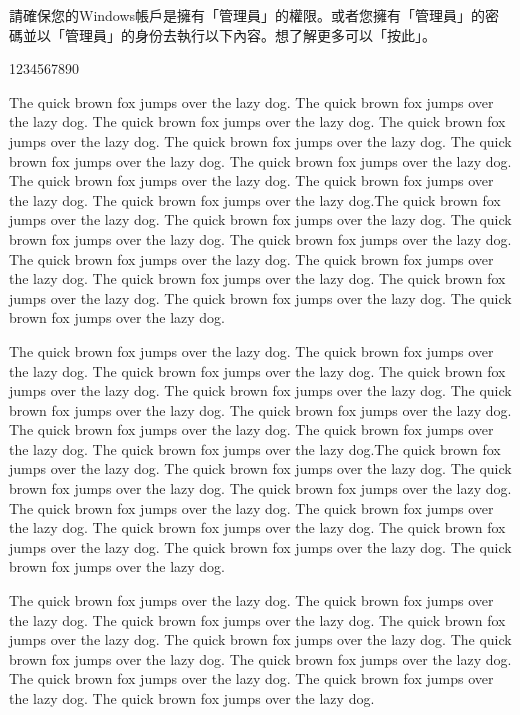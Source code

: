 \documentclass[12pt,a4paper]{article}
\begin{document}
請確保您的Windows帳戶是擁有「管理員」的權限。或者您擁有「管理員」的密碼並以「管理員」的身份去執行以下內容。想了解更多可以「按此」。

1234567890

The quick brown fox jumps over the lazy dog.  The quick brown fox jumps over the lazy dog.  The quick brown fox jumps over the lazy dog.  The quick brown fox jumps over the lazy dog.  The quick brown fox jumps over the lazy dog.  The quick brown fox jumps over the lazy dog.  The quick brown fox jumps over the lazy dog.  The quick brown fox jumps over the lazy dog.  The quick brown fox jumps over the lazy dog.  The quick brown fox jumps over the lazy dog.The quick brown fox jumps over the lazy dog.  The quick brown fox jumps over the lazy dog.  The quick brown fox jumps over the lazy dog.  The quick brown fox jumps over the lazy dog.  The quick brown fox jumps over the lazy dog.  The quick brown fox jumps over the lazy dog.  The quick brown fox jumps over the lazy dog.  The quick brown fox jumps over the lazy dog.  The quick brown fox jumps over the lazy dog.  The quick brown fox jumps over the lazy dog.

The quick brown fox jumps over the lazy dog.  The quick brown fox jumps over the lazy dog.  The quick brown fox jumps over the lazy dog.  The quick brown fox jumps over the lazy dog.  The quick brown fox jumps over the lazy dog.  The quick brown fox jumps over the lazy dog.  The quick brown fox jumps over the lazy dog.  The quick brown fox jumps over the lazy dog.  The quick brown fox jumps over the lazy dog.  The quick brown fox jumps over the lazy dog.The quick brown fox jumps over the lazy dog.  The quick brown fox jumps over the lazy dog.  The quick brown fox jumps over the lazy dog.  The quick brown fox jumps over the lazy dog.  The quick brown fox jumps over the lazy dog.  The quick brown fox jumps over the lazy dog.  The quick brown fox jumps over the lazy dog.  The quick brown fox jumps over the lazy dog.  The quick brown fox jumps over the lazy dog.  The quick brown fox jumps over the lazy dog.

The quick brown fox jumps over the lazy dog.  The quick brown fox jumps over the lazy dog.  The quick brown fox jumps over the lazy dog.  The quick brown fox jumps over the lazy dog.  The quick brown fox jumps over the lazy dog.  The quick brown fox jumps over the lazy dog.  The quick brown fox jumps over the lazy dog.  The quick brown fox jumps over the lazy dog.  The quick brown fox jumps over the lazy dog.  The quick brown fox jumps over the lazy dog.
\end{document}
